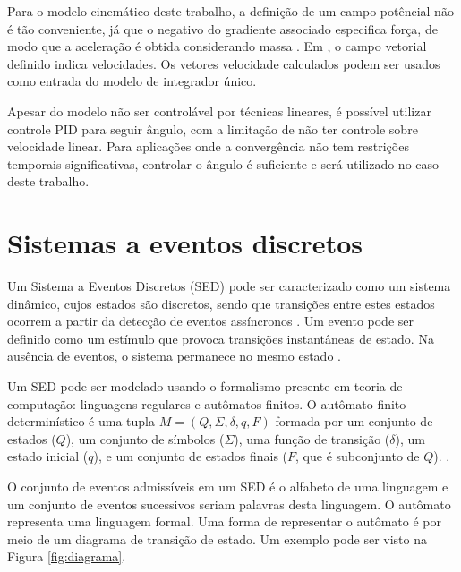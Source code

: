 Para o modelo cinemático deste trabalho, a definição de um campo potêncial não é
tão conveniente, já que o negativo do gradiente associado especifica
força, de modo que a aceleração é obtida considerando massa
\cite{art:wallfollowing, book:HallidayDaMassa}. Em ,
o campo vetorial definido indica velocidades. Os vetores velocidade calculados
podem ser usados como entrada do modelo de integrador único.

Apesar do modelo não ser controlável por técnicas lineares, é possível utilizar 
controle PID para seguir ângulo, com a limitação de não ter controle sobre 
velocidade linear. Para aplicações onde a convergência não tem restrições 
temporais significativas, controlar o ângulo é suficiente e será utilizado no caso 
deste trabalho.


\section{Sistemas a eventos discretos}

Um Sistema a Eventos Discretos (SED) pode ser caracterizado como um sistema
dinâmico, cujos estados são discretos, sendo que transições entre estes estados ocorrem
a partir da detecção de eventos assíncronos \cite{book:SED}. Um evento pode ser
definido como um estímulo que provoca transições instantâneas de estado. Na
ausência de eventos, o sistema permanece no mesmo estado \cite{man:Cury}.

Um SED pode ser modelado usando o formalismo presente em teoria de computação:
linguagens regulares e autômatos finitos. O autômato finito determinístico é uma
tupla $M=(Q,\Sigma,\delta,q,F)$ formada por um conjunto de estados ($Q$), um conjunto
de símbolos ($\Sigma$), uma função de transição ($\delta$), um estado inicial
($q$), e um conjunto de estados finais ($F$, que é subconjunto de $Q$). \cite{book:SED,
book:TeoriaComp}.

O conjunto de eventos admissíveis em um SED é o alfabeto de uma linguagem e um
conjunto de eventos sucessivos seriam palavras desta linguagem. O autômato
representa uma linguagem formal. Uma forma de representar o autômato é por meio
de um diagrama de transição de estado. Um exemplo pode ser visto na Figura
\ref{fig:diagrama}.



